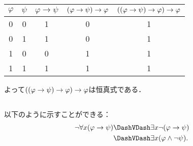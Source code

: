 \begin{table}[htbp]
	\centering
	\begin{tabular}{cc|ccc}
		\hline
		\(\varphi\) & \(\psi\) & \(\varphi \to \psi\) & \(\paren{\varphi \to \psi} \to \varphi\) & \(\paren{\paren{\varphi \to \psi} \to \varphi} \to \varphi\) \\ \hline
		0           & 0        & 1                    & 0                                        & 1                                                            \\
		0           & 1        & 1                    & 0                                        & 1                                                            \\
		1           & 0        & 0                    & 1                                        & 1                                                            \\
		1           & 1        & 1                    & 1                                        & 1                                                            \\
		\hline
	\end{tabular}
\end{table}

よって\(\paren{\paren{\varphi \to \psi} \to \varphi} \to \varphi\)は恒真式である．

\subsection*{}

以下のように示すことができる：
\begin{align*}
	\lnot \forall x \paren{\varphi \to \psi} & \logicallyequivalent \exists x \lnot \paren{\varphi \to \psi}    \\
	                                         & \logicallyequivalent \exists x \paren{\varphi \land \lnot \psi}.
\end{align*}

\section*{}

\subsection*{}

